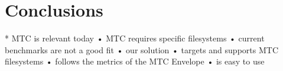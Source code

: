 
\chapter{Conclusions} %

\label{Chapter5} %


* MTC is relevant today
• MTC requires specific filesystems
• current benchmarks are not a good fit
• our solution
• targets and supports MTC filesystems
• follows the metrics of the MTC Envelope
• is easy to use